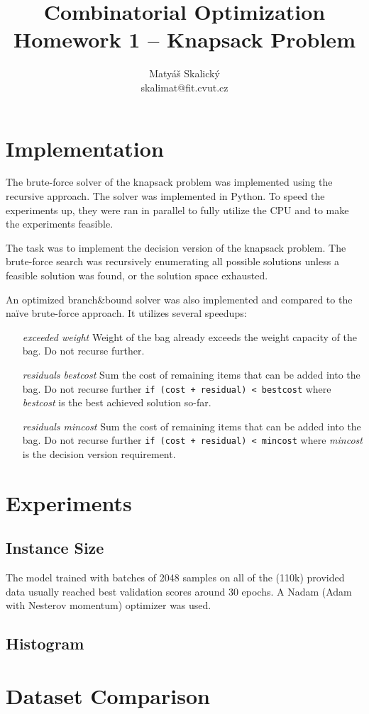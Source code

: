 \documentclass[a4paper,10pt]{article}
\title{Combinatorial Optimization\\Homework 1 – Knapsack Problem}
\author{Matyáš Skalický\\skalimat@fit.cvut.cz}
\begin{document}
\maketitle
\tableofcontents
\medskip


\section{Implementation}
The brute-force solver of the knapsack problem was implemented using the recursive approach. The solver was implemented in Python. To speed the experiments up, they were ran in parallel to fully utilize the CPU and to make the experiments feasible.

The task was to implement the decision version of the knapsack problem. The brute-force search was recursively enumerating all possible solutions unless a feasible solution was found, or the solution space exhausted.

An optimized branch\&bound solver was also implemented and compared to the naïve brute-force approach. It utilizes several speedups:

\begin{enumerate}[leftmargin=1in]
	\item[\emph{exceeded weight}] Weight of the bag already exceeds the weight capacity of the bag. Do not recurse further.
	\item[\emph{residuals bestcost}] Sum the cost of remaining items that can be added into the bag. Do not recurse further \lstinline{if (cost + residual) < bestcost} where \emph{bestcost} is the best achieved solution so-far.
	\item[\emph{residuals mincost}] Sum the cost of remaining items that can be added into the bag. Do not recurse further \lstinline{if (cost + residual) < mincost} where \emph{mincost} is the decision version requirement.
\end{enumerate}


\section{Experiments}
\subsection{Instance Size}
The model trained with batches of 2048 samples on all of the (110k) provided data usually reached best validation scores around 30 epochs. A Nadam (Adam with Nesterov momentum) optimizer was used. 

\subsection{Histogram}

\section{Dataset Comparison}


\end{document}

